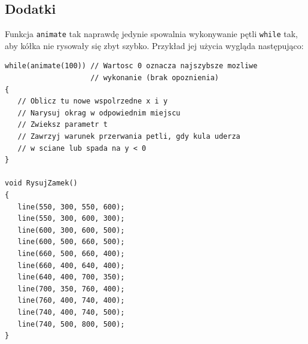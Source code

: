 \documentclass{instrukcja}
\begin{document}
\subsection*{Dodatki}
Funkcja {\tt animate} tak naprawdę jedynie spowalnia wykonywanie pętli {\tt while} tak, aby kółka nie rysowały się zbyt szybko. Przykład jej użycia wygląda następująco:
\begin{verbatim}
while(animate(100)) // Wartosc 0 oznacza najszybsze mozliwe
                    // wykonanie (brak opoznienia)
{
   // Oblicz tu nowe wspolrzedne x i y
   // Narysuj okrag w odpowiednim miejscu
   // Zwieksz parametr t
   // Zawrzyj warunek przerwania petli, gdy kula uderza
   // w sciane lub spada na y < 0
}

void RysujZamek()
{
   line(550, 300, 550, 600);
   line(550, 300, 600, 300);
   line(600, 300, 600, 500);
   line(600, 500, 660, 500);
   line(660, 500, 660, 400);
   line(660, 400, 640, 400);
   line(640, 400, 700, 350);
   line(700, 350, 760, 400);
   line(760, 400, 740, 400);
   line(740, 400, 740, 500);
   line(740, 500, 800, 500);
}
\end{verbatim}
\end{document}
